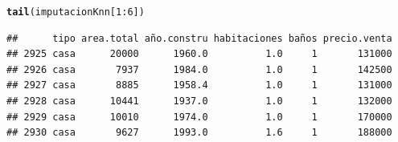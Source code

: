 \documentclass[9pt,letterpaper]{article}\usepackage[]{graphicx}\usepackage[]{color}
\makeatletter
\newcommand{\hlnum}[1]{\textcolor[rgb]{0.686,0.059,0.569}{#1}}%
\newcommand{\hlopt}[1]{\textcolor[rgb]{0,0,0}{#1}}%
\newcommand{\hlstd}[1]{\textcolor[rgb]{0.345,0.345,0.345}{#1}}%
\newcommand{\hlkwd}[1]{\textcolor[rgb]{0.737,0.353,0.396}{\textbf{#1}}}%
\newenvironment{kframe}{%
 \def\at@end@of@kframe{}%
 \ifinner\ifhmode%
  \def\at@end@of@kframe{\end{minipage}}%
  \begin{minipage}{\columnwidth}%
 \fi\fi%
 \def\FrameCommand##1{\hskip\@totalleftmargin \hskip-\fboxsep
 \colorbox{shadecolor}{##1}\hskip-\fboxsep
     \hskip-\linewidth \hskip-\@totalleftmargin \hskip\columnwidth}%
 \MakeFramed {\advance\hsize-\width
   \@totalleftmargin\z@ \linewidth\hsize
   \@setminipage}}%
 {\par\unskip\endMakeFramed%
 \at@end@of@kframe}
\newenvironment{knitrout}{}{} %
\makeatother
\begin{document}
\begin{enumerate}
\begin{enumerate}
\begin{knitrout}
\color{fgcolor}\begin{kframe}
\begin{alltt}
\hlkwd{tail}\hlstd{(imputacionKnn[}\hlnum{1}\hlopt{:}\hlnum{6}\hlstd{])}
\end{alltt}
\begin{verbatim}
##      tipo area.total año.constru habitaciones baños precio.venta
## 2925 casa      20000      1960.0          1.0     1       131000
## 2926 casa       7937      1984.0          1.0     1       142500
## 2927 casa       8885      1958.4          1.0     1       131000
## 2928 casa      10441      1937.0          1.0     1       132000
## 2929 casa      10010      1974.0          1.0     1       170000
## 2930 casa       9627      1993.0          1.6     1       188000
\end{verbatim}
\end{kframe}
\end{knitrout}
     

\end{enumerate}
\end{enumerate}
\end{document}
